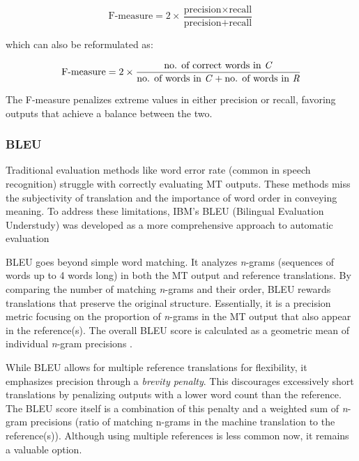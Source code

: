 {{\begin{equation}
\text{F-measure} = 2 \times \frac{\text{precision} \times \text{recall}}{\text{precision} + \text{recall}}
\end{equation} \break

which can also be reformulated as:

\begin{equation}
\text{F-measure} = 2 \times \frac{\text{no. of correct words in \emph{C}}}{\text{no. of words in \emph{C}} + \text{no. of words in \emph{R}}}
\end{equation} \break


The F-measure penalizes extreme values in either precision or recall, favoring outputs that achieve a balance between the two. 


\subsubsection{BLEU}

Traditional evaluation methods like word error rate (common in speech recognition) struggle with correctly evaluating MT outputs. These methods miss the subjectivity of translation and the importance of word order in conveying meaning. To address these limitations, IBM’s BLEU (Bilingual Evaluation Understudy) was developed as a more comprehensive approach to automatic evaluation \parencite{papineni-etal-2002-bleu}

BLEU goes beyond simple word matching. It analyzes \emph{n}-grams (sequences of words up to 4 words long) in both the MT output and reference translations. By comparing the number of matching \emph{n}-grams and their order, BLEU rewards translations that preserve the original structure. Essentially, it is a precision metric focusing on the proportion of \emph{n}-grams in the MT output that also appear in the reference(s). The overall BLEU score is calculated as a geometric mean of individual \emph{n}-gram precisions  \parencite{koehn2020neural}.

While BLEU allows for multiple reference translations for flexibility, it emphasizes precision through a \emph{brevity penalty}. This discourages excessively short translations by penalizing outputs with a lower word count than the reference. The BLEU score itself is a combination of this penalty and a weighted sum of \emph{n}-gram precisions (ratio of matching n-grams in the machine translation to the reference(s)). Although using multiple references is less common now, it remains a valuable option.

}}
